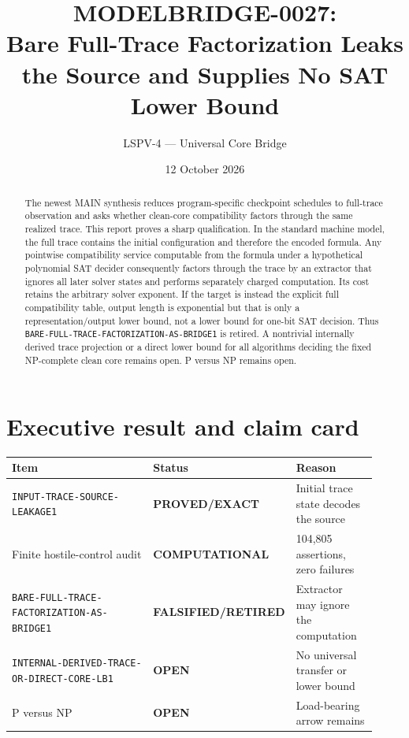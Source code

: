 \documentclass[11pt]{article}
\title{MODELBRIDGE-0027:\\Bare Full-Trace Factorization Leaks the Source and Supplies No SAT Lower Bound}
\author{LSPV-4 --- Universal Core Bridge}
\date{12 October 2026}
\newcommand{\EXACT}{\textbf{PROVED/EXACT}}
\newcommand{\COMP}{\textbf{COMPUTATIONAL}}
\newcommand{\OPEN}{\textbf{OPEN}}
\newcommand{\RETIRED}{\textbf{FALSIFIED/RETIRED}}
\begin{document}
\sloppy
\maketitle

\begin{abstract}
The newest MAIN synthesis reduces program-specific checkpoint schedules to
full-trace observation and asks whether clean-core compatibility factors
through the same realized trace.  This report proves a sharp qualification.
In the standard machine model, the full trace contains the initial
configuration and therefore the encoded formula.  Any pointwise compatibility
service computable from the formula under a hypothetical polynomial SAT
decider consequently factors through the trace by an extractor that ignores
all later solver states and performs separately charged computation.  Its cost
retains the arbitrary solver exponent.  If the target is instead the explicit
full compatibility table, output length is exponential but that is only a
representation/output lower bound, not a lower bound for one-bit SAT decision.
Thus \texttt{BARE-FULL-TRACE-FACTORIZATION-AS-BRIDGE1} is retired.  A
nontrivial internally derived trace projection or a direct lower bound for all
algorithms deciding the fixed NP-complete clean core remains open.  P versus
NP remains open.
\end{abstract}

\section{Executive result and claim card}
\begin{center}\footnotesize
\begin{tabular}{p{0.43\linewidth}p{0.26\linewidth}p{0.23\linewidth}}
\toprule
Item & Status & Reason\\
\midrule
\texttt{INPUT-TRACE-SOURCE-LEAKAGE1} & \EXACT & Initial trace state decodes the source\\
Finite hostile-control audit & \COMP & 104,805 assertions, zero failures\\
\texttt{BARE-FULL-TRACE-FACTORIZATION-AS-BRIDGE1} & \RETIRED & Extractor may ignore the computation\\
\texttt{INTERNAL-DERIVED-TRACE-OR-DIRECT-CORE-LB1} & \OPEN & No universal transfer or lower bound\\
P versus NP & \OPEN & Load-bearing arrow remains\\
\bottomrule
\end{tabular}
\end{center}
\end{document}
